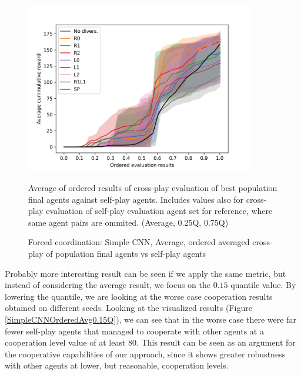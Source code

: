 \begin{figure}[!ht]
    \centering
    \includegraphics*[width=10cm]{../img/SimpleCNNOrderedAvg.png}

    \caption{Forced coordination: Simple CNN, Average, ordered averaged cross-play of population final agents vs self-play agents}
    \label{SimpleCNNOrderedAvg}
    \medskip
    \small 
    Average of ordered results of cross-play evaluation of best population final agents against self-play agents.
    Includes values also for cross-play evaluation of self-play evaluation agent set for reference, where same agent pairs are ommited.
    (Average, 0.25Q, 0.75Q)

\end{figure}

Probably more interesting result can be seen if we apply the same metric, but instead of considering the average result, we focus on the $0.15$ quantile value.
By lowering the quantile, we are looking at the worse case cooperation results obtained on different seeds.
Looking at the visualized results (Figure \ref{SimpleCNNOrderedAvg0.15Q}), we can see that in the worse case there were far fewer self-play agents that managed to cooperate with other agents at a cooperation level value of at least 80.
This result can be seen as an argument for the cooperative capabilities of our approach, since it shows greater robustness with other agents at lower, but reasonable, cooperation levels.



